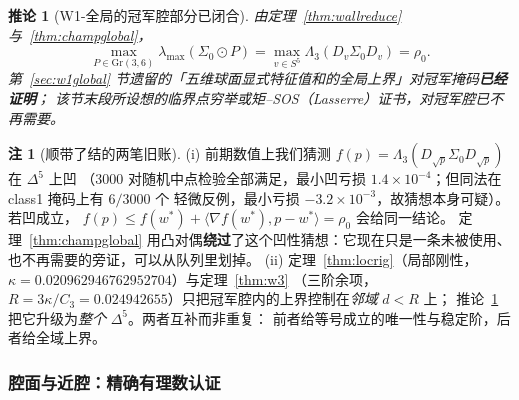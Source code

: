 \documentclass[UTF8,11pt]{ctexart}
\newtheorem{corollary}[theorem]{推论}
\theoremstyle{definition}
\newtheorem{remark}[theorem]{注}
\newcommand{\Lam}{\Lambda}
\begin{document}
\begin{corollary}[W1-全局的冠军腔部分已闭合]\label{cor:chamberclosed}
由定理~\ref{thm:wallreduce} 与~\ref{thm:champglobal}，
\[
\max_{P\in\mathrm{Gr}(3,6)}\lambda_{\max}(\Sigma_0\odot P)=\max_{v\in S^5}\Lam_3(D_v\Sigma_0D_v)=\rho_0 .
\]
第~\ref{sec:w1global} 节遗留的「五维球面显式特征值和的全局上界」对冠军掩码\textbf{已经证明}；
该节末段所设想的临界点穷举或矩--SOS（Lasserre）证书，对冠军腔已不再需要。
\end{corollary}

\begin{remark}[顺带了结的两笔旧账]\label{rmk:concav}
(i) 前期数值上我们猜测 $f(p)=\Lam_3(D_{\sqrt p}\Sigma_0D_{\sqrt p})$ 在 $\Delta^5$ 上凹
（$3000$ 对随机中点检验全部满足，最小凹亏损 $1.4\times10^{-4}$；但同法在 class1 掩码上有 $6/3000$ 个
轻微反例，最小亏损 $-3.2\times10^{-3}$，故猜想本身可疑）。若凹成立，
$f(p)\le f(w^*)+\langle\nabla f(w^*),p-w^*\rangle=\rho_0$ 会给同一结论。
定理~\ref{thm:champglobal} 用凸对偶\textbf{绕过}了这个凹性猜想：它现在只是一条未被使用、
也不再需要的旁证，可以从队列里划掉。
(ii) 定理~\ref{thm:locrig}（局部刚性，$\kappa=0.020962946762952704$）与定理~\ref{thm:w3}
（三阶余项，$R=3\kappa/C_3=0.024942655$）只把冠军腔内的上界控制在\emph{邻域} $d<R$ 上；
推论~\ref{cor:chamberclosed} 把它升级为\emph{整个} $\Delta^5$。两者互补而非重复：
前者给等号成立的唯一性与稳定阶，后者给全域上界。
\end{remark}

\subsubsection*{腔面与近腔：精确有理数认证}
\end{document}

